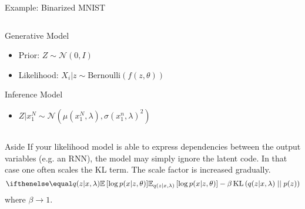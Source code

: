 \documentclass[14pt, aspectratio=169]{beamer}
\begin{document}
\begin{frame}{Example: Binarized MNIST}

\begin{columns}
	\begin{column}{0.75\textwidth}  

		Generative Model
		\begin{itemize}
			\item Prior: $Z \sim \mathcal N(0, I)$
			\item Likelihood: $X_i|z \sim \text{Bernoulli}(f(z, \theta))$
		\end{itemize}
   		Inference Model
		\begin{itemize}
			\item $Z|x_1^N \sim \mathcal N(\mu(x_1^N, \lambda), \sigma(x_1^n, \lambda)^2)$
		\end{itemize}
    \end{column}
	\begin{column}{0.2\textwidth}
    \end{column}    
    \end{columns}
    

\end{frame}

\begin{frame}{Aside}
If your likelihood model is able to express dependencies between the output variables (e.g. an RNN), the model may simply ignore the latent code.
In that case one often scales the KL term. The scale factor is increased gradually.
\begin{equation*}
\E[q(z|x,\lambda)]{\log p(x|z,\theta)} - \beta \KL{q(z|x,\lambda)}{p(z)}
\end{equation*}
where $ \beta \rightarrow 1 $.
\end{frame}
\end{document}
